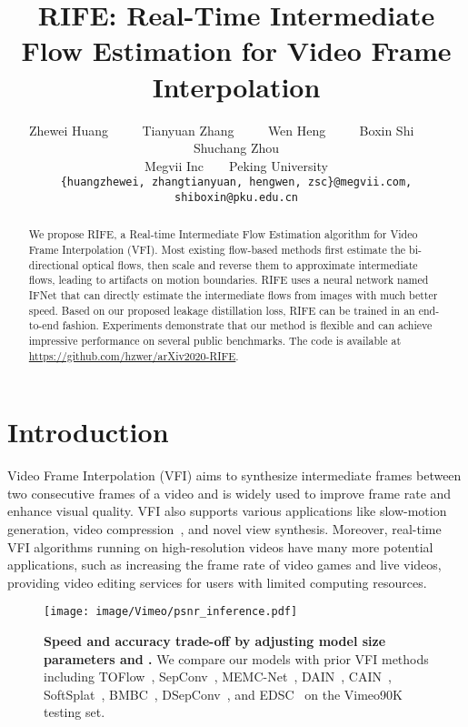 \documentclass[10pt,twocolumn,letterpaper]{article}
\begin{document}
\title{RIFE: Real-Time Intermediate Flow Estimation for Video Frame Interpolation}

\author{Zhewei Huang
		~~~~
		Tianyuan Zhang
		~~~~
		Wen Heng
		~~~~
		Boxin Shi
		~~~~
		Shuchang Zhou\\
		Megvii Inc~~~~Peking University\\
		{\tt\small \{huangzhewei, zhangtianyuan, hengwen, zsc\}@megvii.com, shiboxin@pku.edu.cn}
		}
\maketitle
\ificcvfinal\thispagestyle{empty}\fi

\begin{abstract}
   We propose RIFE, a Real-time Intermediate Flow Estimation algorithm for Video Frame Interpolation (VFI). Most existing flow-based methods first estimate the bi-directional optical flows, then scale and reverse them to approximate intermediate flows, leading to artifacts on motion boundaries. RIFE uses a neural network named IFNet that can directly estimate the intermediate flows from images with much better speed. Based on our proposed leakage distillation loss, RIFE can be trained in an end-to-end fashion. Experiments demonstrate that our method is flexible and can achieve impressive performance on several public benchmarks. The code is available at \url{https://github.com/hzwer/arXiv2020-RIFE}.
\end{abstract}

\section{Introduction}
Video Frame Interpolation (VFI) aims to synthesize intermediate frames between two consecutive frames of a video and is widely used to improve frame rate and enhance visual quality. VFI also supports various applications like slow-motion generation, video compression~\cite{wu2018video}, and novel view synthesis. Moreover, real-time VFI algorithms running on high-resolution videos have many more potential applications, such as increasing the frame rate of video games and live videos, providing video editing services for users with limited computing resources.

\begin{figure}
	\vspace{-2em}
	\centering
	\texttt{[image: image/Vimeo/psnr\_inference.pdf]}
	\vspace{-0.5em}
	\caption{\textbf{Speed and accuracy trade-off by adjusting model size parameters  and .} We compare our models with prior VFI methods including TOFlow~\cite{xue2019video}, SepConv~\cite{Niklaus_ICCV_2017}, MEMC-Net~\cite{bao2019memc}, DAIN~\cite{bao2019depth}, CAIN~\cite{choi2020channel}, SoftSplat~\cite{niklaus2020softmax}, BMBC~\cite{park2020bmbc}, DSepConv~\cite{cheng2020video}, and EDSC~\cite{cheng2020multiple} on the Vimeo90K testing set. }
	\label{fig:intro_fig}\vspace{-0.5em}
\end{figure}
\end{document}
